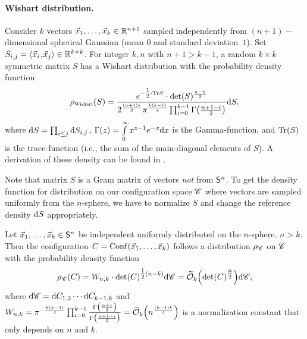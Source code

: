 \paragraph{Wishart distribution.} Consider $k$ vectors $\vec x_1, \ldots, \vec x_k \in {{\mathbb R}}^{n+1}$ sampled independently from $(n+1)-$ dimensional spherical Gaussian (mean $0$ and standard deviation\ $1$). Set $S_{i,j} = \langle\vec x_i\!\mathbin{,}\!\vec x_j\rangle \in {{\mathbb R}}^{k \times k}$. For integer $k, n$ with $n+1 > k-1$, a random $k \times k$ symmetric matrix $S$ has a Wishart distribution with the probability density function
\begin{equation} \label{eq:WishartDensity}
	\pW(S) = \frac{e^{-\tfrac{1}{2} \cdot \Tr S} \cdot \det(S)^{\frac{n-k}{2}}}{2^{\frac{(n+1)k}{2}} \pi^{\frac{k (k-1)}{4}} \prod_{i=0}^{k-1} \Gamma \bigl( \frac{n+1-i}{2} \bigr)}  \d S,
\end{equation}
where $\mathrm{d} S = \prod_{i \leq j} \mathrm{d} S_{i,j}$, $\Gamma(z) = \int\limits_0^\infty x^{z-1} e^{-x}\mathrm{d} x$ is the Gamma-function, and $\text{Tr}(S)$ is the trace-function (i.e., the sum of the main-diagonal elements of $S$). A derivation of these density can be found in \cite{Eaton07}. 

Note that matrix $S$ is a Gram matrix of vectors \emph{not} from $\mathsf{S}^{n}$. To get the density function for distribution on our configuration space $\mathscr{C}$ where vectors are sampled uniformly from the $n$-sphere, we have to normalize $S$ and change the reference density $\mathrm{d} S$ appropriately. 

\begin{thm} \label{thm:WishartDist}
Let $\vec x_1, \ldots, \vec x_k \in \mathsf{S}^{n}$ be independent uniformly distributed on the $n$-sphere, $n > k$. Then the configuration $C = \text{Conf}\mkern2mu(\vec x_1, \ldots, \vec x_k)$ follows a distribution $\rho_{\mathscr{C}}$ on $\mathscr{C}$ with the probability density function
\[
	\rho_{\mathscr{C}} (C) = W_{n,k} \cdot \det(C)^{\tfrac{1}{2}(n-k)} \mathrm{d} \mathscr{C} = \widetilde{\mathcal{O}}_k \Bigl( \det(C)^{\tfrac{n}{2}}\Bigr) \mathrm{d} \mathscr{C},
\]
where $\mathrm{d} \mathscr{C} = \mathrm{d} C_{1,2} \cdots \mathrm{d} C_{k-1, k}$ and $W_{n,k} = \pi^{-\frac{k(k-1)}{4}} \prod_{i=0}^{k-1} \frac{\Gamma \bigl( \frac{n+1}{2} \bigr)}{\Gamma\bigl( \frac{n+1-i}{2} \bigr)} = \widetilde{\mathcal{O}}_k\Bigl( n^{\frac{(k-1)k}{4}} \Bigr)$ is a normalization constant that only depends on $n$ and $k$.
\end{thm}

